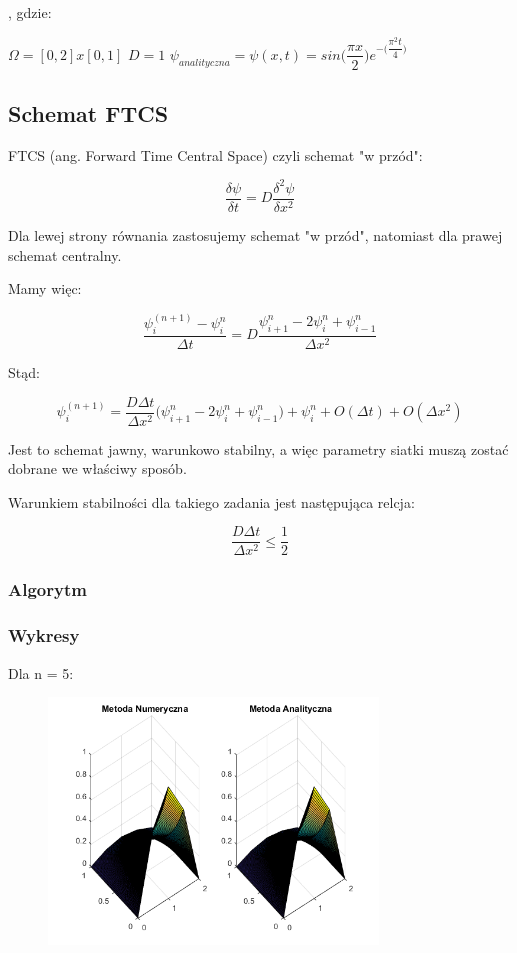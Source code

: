 , gdzie:

$\Omega = [0,2]x[0,1]$
\newline
$D=1$
\newline
\vspace{0.2cm}
$\psi_{analityczna}=\psi(x,t)=sin\Big(\dfrac{\pi x}{2}\Big)e^{-\Big(\dfrac{\pi^2 t}{4}\Big)}$

\subsection{Schemat FTCS}

FTCS (ang. Forward Time Central Space) czyli schemat "w przód":

$$\dfrac{\delta \psi}{\delta t} = D\dfrac{\delta^2 \psi}{\delta x^2}$$

Dla lewej strony równania zastosujemy schemat "w przód", natomiast dla prawej schemat centralny.

Mamy więc:

$$\dfrac{\psi^{(n+1)}_{i}-\psi^n_{i}}{\Delta t}=D\dfrac{\psi^{n}_{i+1}-2\psi^n_{i}+\psi^n_{i-1}}{\Delta x^2}$$

Stąd:

$$\psi^{(n+1)}_{i}=\dfrac{D\Delta t}{\Delta x^2}\Big(\psi^{n}_{i+1}-2\psi^{n}_{i}+\psi^{n}_{i-1}\Big)+\psi^{n}_{i} + O(\Delta t)+O(\Delta x^2)$$

Jest to schemat jawny, warunkowo stabilny, a więc parametry siatki muszą zostać dobrane we właściwy sposób.

Warunkiem stabilności dla takiego zadania jest następująca relcja:

$$\dfrac{D\Delta t}{\Delta x^2}\le \dfrac{1}{2}$$
\newpage
\subsubsection{Algorytm}


\newpage
\subsubsection{Wykresy}

Dla n = 5:

\begin{figure}[!ht]
	\begin{center}
		\includegraphics[width=0.78\textwidth]{Lab7/charts/ftcs/5.png}
	\end{center}
\end{figure}

